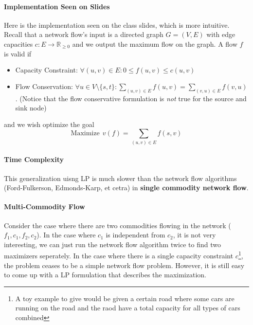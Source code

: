 \documentclass[10pt]{article}
\newcommand{\real}{\mathbb{R}}
\begin{document}
\paragraph{Implementation Seen on Slides} Here is the implementation seen on the class slides, which is more intuitive. Recall that a network flow's input is a directed graph $G = (V,E)$ with edge capacities $c:E\rightarrow \real_{\geq 0}$ and we output the maximum flow on the graph. A flow $f$ is valid if
\begin{itemize}
    \item Capacity Constraint: $\forall (u,v) \in E: 0 \leq f(u,v) \leq c(u,v)$
    \item Flow Conservation: $\forall u\in V\setminus\{s,t\}: \sum_{(u,v)\in E}f(u,v) = \sum_{(v,u)\in E}f(v,u)$. (Notice that the flow conservative formulation is \textit{not} true for the source and sink node)
\end{itemize}
and we wish optimize the goal
\begin{equation*}
    \text{Maximize}~~v(f) = \sum_{(u,v)\in E} f(s,v)
\end{equation*}

\paragraph{Time Complexity} This generalization uisng LP is much slower than the network flow algorithms (Ford-Fulkerson, Edmonds-Karp, et cetra) in \textbf{single commodity network flow}. 

\paragraph{Multi-Commodity Flow} Consider the case where there are two commodities flowing in the network ($f_1, c_1, f_2, c_2$). In the case where $c_1$ is independent from $c_2$, it is not very interesting, we can just run the network flow algorithm twice to find two maximizers seperately. In the case where there is a single capacity constraint $c$\footnote{A toy example to give would be given a certain road where some cars are running on the road and the raod have a total capacity for all types of cars combined}, the problem ceases to be a simple network flow problem. However, it is still easy to come up with a LP formulation that describes the maximization. 
\end{document}
